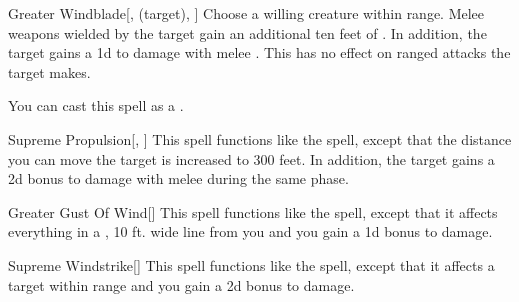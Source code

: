 \lowercase{\hypertarget{spell:Greater Windblade}{}}\label{spell:Greater Windblade}
\begin{attuneability}[\nth{4}]{\hypertarget{spell:Greater Windblade}{Greater Windblade}}[,  (target), ]
Choose a willing creature within \rngclose range.
Melee weapons wielded by the target gain an additional ten feet of .
In addition, the target gains a \plus1d  to damage with melee .
This has no effect on ranged attacks the target makes.

You can cast this spell as a .
\end{attuneability}
\vspace{0.25em}



\lowercase{\hypertarget{spell:Supreme Propulsion}{}}\label{spell:Supreme Propulsion}
\begin{apability}[\nth{4}]{\hypertarget{spell:Supreme Propulsion}{Supreme Propulsion}}[, ]
This spell functions like the  spell, except that the distance you can move the target is increased to 300 feet.
In addition, the target gains a \plus2d bonus to damage with melee  during the same phase.
\end{apability}
\vspace{0.25em}



\lowercase{\hypertarget{spell:Greater Gust Of Wind}{}}\label{spell:Greater Gust Of Wind}
\begin{apability}[\nth{5}]{\hypertarget{spell:Greater Gust Of Wind}{Greater Gust Of Wind}}[]
This spell functions like the  spell, except that it affects everything in a \areahuge, 10 ft. wide line from you and you gain a \plus1d bonus to damage.
\end{apability}
\vspace{0.25em}



\lowercase{\hypertarget{spell:Supreme Windstrike}{}}\label{spell:Supreme Windstrike}
\begin{apability}[\nth{5}]{\hypertarget{spell:Supreme Windstrike}{Supreme Windstrike}}[]
This spell functions like the  spell, except that it affects a target within \rngext range and you gain a \plus2d bonus to damage.
\end{apability}
\vspace{0.25em}



